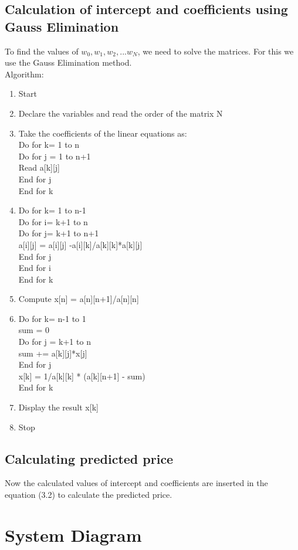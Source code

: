 \subsection{ Calculation of intercept and coefficients using Gauss Elimination}
To find the values of $w_{0},w_{1},w_{2},...w_{N}$, we need to solve the matrices. For this we use the Gauss Elimination method.\\
Algorithm:
\vspace{-18pt}
\begin{enumerate}
\item Start
\item Declare the variables and read the order of the matrix N
\item Take the coefficients of the linear equations as:\\
Do for k= 1 to n\\
Do for j = 1 to n+1\\
Read a[k][j]\\
End for j\\
End for k
\item Do for k= 1 to n-1\\
Do for i= k+1 to n\\
Do for j= k+1 to n+1\\
a[i][j] = a[i][j] -a[i][k]/a[k][k]*a[k][j]\\
End for j\\
End for i\\
End for k
\item Compute x[n] = a[n][n+1]/a[n][n]
\item Do for k= n-1 to 1\\
sum = 0\\
Do for j = k+1 to n\\
sum += a[k][j]*x[j]\\
End for j\\
x[k] = 1/a[k][k] * (a[k][n+1] - sum)\\
End for k
\item Display the result x[k]
\item Stop 
\end{enumerate}
\subsection{Calculating predicted price}
Now the calculated values of intercept and coefficients are inserted in the equation (3.2) to calculate the predicted price.
\section{System Diagram}

